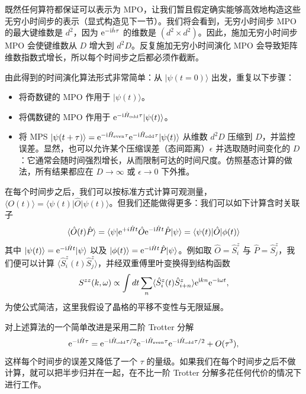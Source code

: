 \documentclass[a4paper,10pt,oneside,onecolumn,1p,times]{elsarticle}
\newcommand{\eul}{{\rm e }}
\newcommand{\imag}{{\rm i }}
\newcommand{\bra}[1]{\mbox{$\langle #1  |$}}
\newcommand{\ket}[1]{\mbox{$| #1  \rangle$}}
\begin{document}
既然任何算符都保证可以表示为 MPO，让我们暂且假定确实能够高效地构造这些无穷小时间步的表示（显式构造见下一节）。我们将会看到，无穷小时间步 MPO 的最大键维数是 $d^2$，因为 $\eul^{-\imag \hat{h} \tau}$ 的维数是 $(d^2 \times d^2)$。因此，施加无穷小时间步 MPO 会使键维数从 $D$ 增大到 $d^2 D$。反复施加无穷小时间演化 MPO 会导致矩阵维数指数式增长，所以每个时间步之后都必须作截断。

由此得到的时间演化算法形式非常简单：从 $\ket{\psi(t=0)}$ 出发，重复以下步骤：
\begin{itemize}
\item 将奇数键的 MPO 作用于 $\ket{\psi(t)}$。
\item 将偶数键的 MPO 作用于 $\eul^{-\imag \hat{H}_{{\rm odd}}\tau}\ket{\psi(t)}$。
\item 将 MPS $\ket{\psi(t+\tau)}=\eul^{-\imag \hat{H}_{{\rm even}}\tau}\eul^{-\imag \hat{H}_{{\rm odd}}\tau}\ket{\psi(t)}$ 从维数 $d^2 D$ 压缩到 $D$，并监控误差。显然，也可以允许某个压缩误差（态间距离）$\epsilon$ 并选取随时间变化的 $D$：它通常会随时间强烈增长，从而限制可达的时间尺度。仿照基态计算的做法，所有结果都应在 $D\rightarrow\infty$ 或 $\epsilon\rightarrow 0$ 下外推。
\end{itemize}

在每个时间步之后，我们可以按标准方式计算可观测量，$\langle O(t) \rangle = \bra{\psi(t)} \hat{O} \ket{\psi(t)}$。但我们还能做得更多：我们可以如下计算含时关联子
\begin{equation}
\langle \hat{O}(t) \hat{P} \rangle = \bra{\psi} \eul^{+i\hat{H}t} \hat{O} \eul^{-\imag \hat{H}t} \hat{P} \ket{\psi}
= \bra{\psi(t)} \hat{O} \ket{\phi(t)}
\end{equation}
其中 $\ket{\psi(t)} = \eul^{-\imag \hat{H}t}\ket{\psi}$ 以及 $\ket{\phi(t)} = \eul^{-\imag \hat{H}t} \hat{P} \ket{\psi}$。例如取 $\hat{O} = \hat{S}^z_i$ 与 $\hat{P} = \hat{S}^z_j$，我们便可以计算 
$\langle \hat{S}^z_i(t) \hat{S}^z_j \rangle$，并经双重傅里叶变换得到结构函数
\begin{equation}
S^{zz}(k,\omega) \propto \int dt \sum_{n} \langle \hat{S}^z_i(t) \hat{S}^z_{i+n} \rangle \eul^{\imag kn}\eul^{-\imag \omega t},
\end{equation}
为使公式简洁，这里我假设了晶格的平移不变性与无限延展。

对上述算法的一个简单改进是采用二阶 Trotter 分解
\begin{equation}
\eul^{-\imag  \hat{H}\tau} = \eul^{-\imag  \hat{H}_{{\rm odd}} \tau/2}\eul^{-\imag  \hat{H}_{{\rm even}} \tau}\eul^{-\imag  \hat{H}_{{\rm odd}} \tau/2} + O(\tau^3),
\end{equation}
这样每个时间步的误差又降低了一个 $\tau$ 的量级。如果我们在每个时间步之后不做计算，就可以把半步归并在一起，在不比一阶 Trotter 分解多花任何代价的情况下进行工作。
\end{document}
